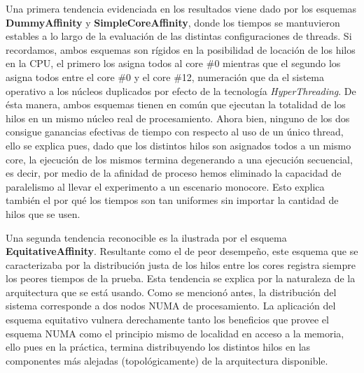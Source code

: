 Una primera tendencia evidenciada en los resultados viene dado por los esquemas \textbf{DummyAffinity} y \textbf{SimpleCoreAffinity}, donde los tiempos se mantuvieron estables a lo largo de la evaluación de las distintas configuraciones de threads. Si recordamos, ambos esquemas son rígidos en la posibilidad de locación de los hilos en la CPU, el primero los asigna todos al core \#0 mientras que el segundo los asigna todos entre el core \#0 y el core \#12, numeración que da el sistema operativo a los núcleos duplicados por efecto de la tecnología \emph{HyperThreading}. De ésta manera, ambos esquemas tienen en común que ejecutan la totalidad de los hilos en un mismo núcleo real de procesamiento. Ahora bien, ninguno de los dos consigue ganancias efectivas de tiempo con respecto al uso de un único thread, ello se explica pues, dado que los distintos hilos son asignados todos a un mismo core, la ejecución de los mismos termina degenerando a una ejecución secuencial, es decir, por medio de la afinidad de proceso hemos eliminado la capacidad de paralelismo al llevar el experimento a un escenario monocore. Esto explica también el por qué los tiempos son tan uniformes sin importar la cantidad de hilos que se usen.

Una segunda tendencia reconocible es la ilustrada por el esquema \textbf{EquitativeAffinity}. Resultante como el de peor desempeño, este esquema que se caracterizaba por la distribución justa de los hilos entre los cores registra siempre los peores tiempos de la prueba. Esta tendencia se explica por la naturaleza de la arquitectura que se está usando. Como se mencionó antes, la distribución del sistema corresponde a dos nodos NUMA de procesamiento. La aplicación del esquema equitativo vulnera derechamente tanto los beneficios que provee el esquema NUMA como el principio mismo de localidad en acceso a la memoria, ello pues en la práctica, termina distribuyendo los distintos hilos en las componentes más alejadas (topológicamente) de la arquitectura disponible.

